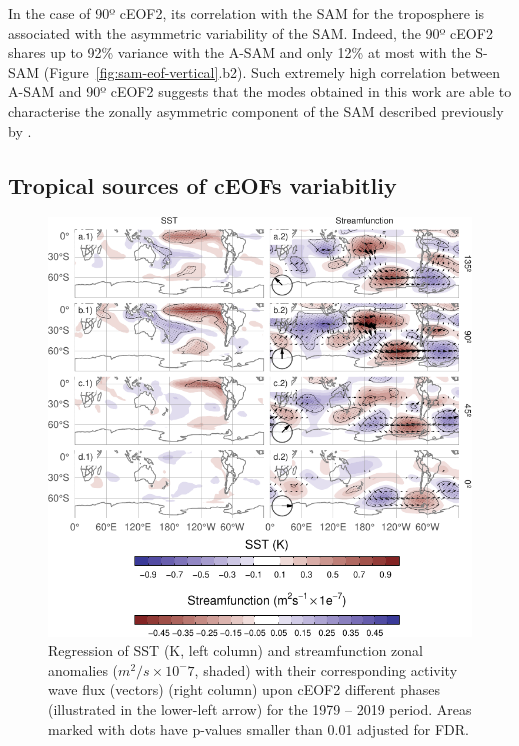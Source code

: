 \documentclass[pdflatex,lineno,sn-basic]{sn-jnl}
\theoremstyle{thmstyleone}%
\theoremstyle{thmstyletwo}%
\theoremstyle{thmstylethree}%
\begin{document}
In the case of 90º cEOF2, its correlation with the SAM for the troposphere is associated with the asymmetric variability of the SAM.
Indeed, the 90º cEOF2 shares up to 92\% variance with the A-SAM and only 12\% at most with the S-SAM (Figure~\ref{fig:sam-eof-vertical}.b2).
Such extremely high correlation between A-SAM and 90º cEOF2 suggests that the modes obtained in this work are able to characterise the zonally asymmetric component of the SAM described previously by \citet{campitelli2022}.

\hypertarget{tropical}{%
\subsection{Tropical sources of cEOFs variabitliy}\label{tropical}}

\begin{figure}
\includegraphics{shceof_files/figure-latex/sst-psi-2-1} \caption{Regression of SST (K, left column) and streamfunction zonal anomalies (\(m^2/s\times10^-7\), shaded) with their corresponding activity wave flux (vectors) (right column) upon cEOF2 different phases (illustrated in the lower-left arrow) for the 1979 -- 2019 period. Areas marked with dots have p-values smaller than 0.01 adjusted for FDR.}\label{fig:sst-psi-2}
\end{figure}
\end{document}
